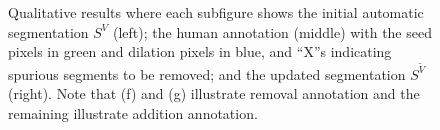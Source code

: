 \documentclass[]{spie}  %
\begin{document}
\begin{figure}[htbp]
 \hspace{1em}

\caption{Qualitative results where each subfigure shows the initial
  automatic segmentation $S^V$ (left); the human annotation (middle)
  with the seed pixels in green and dilation pixels in blue, and
  ``X''s indicating spurious segments to be removed; and the updated
  segmentation $S^{\tilde{V}}$ (right).  Note that (f) and (g)
  illustrate removal annotation and the remaining illustrate addition
  annotation.}
\label{fig:qual}
\end{figure}
\end{document}

